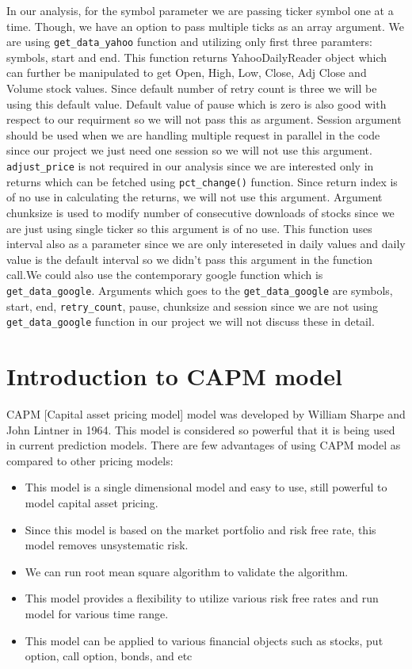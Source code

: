 \indent 
In our analysis, for the symbol parameter we are passing ticker symbol one at a time. Though, we have an option to pass multiple ticks as an array argument. 
We are using \texttt{get\_data\_yahoo} function and utilizing only
first three paramters: symbols, start and end.  This function returns YahooDailyReader object which can further be manipulated to get Open, High, Low, Close, Adj Close
and Volume stock values. Since default number of retry count is three we will be using this default value. Default value of pause which is zero is also good with
respect to our requirment so we will not pass this as argument. Session argument should be used when we are handling multiple request in parallel  in the code
since our project we just need one session so we will not use this argument. \texttt{adjust\_price} is not required in our analysis since we are interested only in returns
which can be fetched using \texttt{pct\_change()} function. Since return index is of no use in calculating the returns, we will not use this argument.
Argument chunksize is used to modify number of consecutive downloads of stocks since we are just using single ticker so this argument is of no use.
This function uses interval also as a parameter since we are only intereseted in daily values and daily value is the default 
interval so we didn't pass this argument in the function call.We could also use the contemporary google function which is \texttt{get\_data\_google}.
Arguments which goes to the \texttt{get\_data\_google} are symbols, start, end, \texttt{retry\_count}, pause, chunksize and session since we are not using 
\texttt{get\_data\_google} function in our project we will not discuss these in detail. 

\section{Introduction to CAPM model}

CAPM [Capital asset pricing model] model was developed by William Sharpe and John Lintner in 1964. This model is considered so powerful that it is being used in current 
prediction models. There are few advantages of using CAPM model as compared to other pricing models:

\begin{itemize}
\item This model is a single dimensional model and easy to use, still powerful to model capital asset pricing. 
\item Since this model is based on the market portfolio and risk free rate, this model removes unsystematic risk.  
\item We can run root mean square algorithm to validate the algorithm.
\item This model provides a flexibility to utilize various risk free rates and run model for various time range. 
\item This model can be applied to various financial objects such as stocks, put option, call option, bonds, and etc

\end{itemize}

